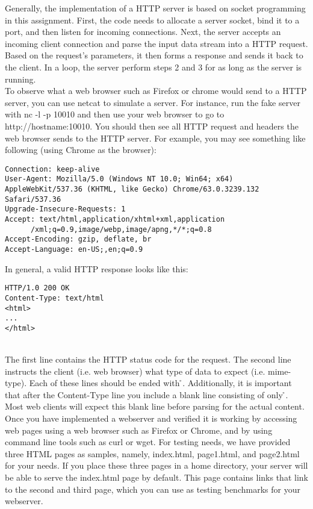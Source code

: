 \indent Generally, the implementation of a HTTP server is based on socket programming in this assignment. First, the code needs to allocate a server socket, bind it to a port, and then listen for incoming connections. Next, the server accepts an incoming client connection and parse the input data stream into a HTTP request. Based on the request's parameters, it then forms a response and sends it back to the client. In a loop, the server perform steps 2 and 3 for as long as the server is running. \\
To observe what a web browser such as Firefox or chrome would send to a HTTP server, you can use netcat to simulate a server. For instance, run the fake server with nc -l -p 10010 and then use your web browser to go to http://hostname:10010. You should then see all HTTP request and headers the web browser sends to the HTTP server. For example, you may see something like following (using Chrome as the browser): \\
\begin{verbatim}
Connection: keep-alive
User-Agent: Mozilla/5.0 (Windows NT 10.0; Win64; x64) 
AppleWebKit/537.36 (KHTML, like Gecko) Chrome/63.0.3239.132 Safari/537.36
Upgrade-Insecure-Requests: 1
Accept: text/html,application/xhtml+xml,application
      /xml;q=0.9,image/webp,image/apng,*/*;q=0.8
Accept-Encoding: gzip, deflate, br
Accept-Language: en-US;,en;q=0.9
\end{verbatim}
In general, a valid HTTP response looks like this:
\begin{verbatim}
HTTP/1.0 200 OK
Content-Type: text/html
<html>
...
</html> 
\end{verbatim}\\
The first line contains the HTTP status code for the request. The second line instructs the client (i.e. web browser) what type of data to expect (i.e. mime-type). Each of these lines should be ended with \r\n. Additionally, it is important that after the Content-Type line you include a blank line consisting of only \r\n. Most web clients will expect this blank line before parsing for the actual content. \\
Once you have implemented a webserver and verified it is working by accessing web pages using a web browser such as Firefox or Chrome, and by using command line tools such as curl or wget. For testing needs, we have provided three HTML pages as samples, namely, index.html, page1.html, and page2.html for your needs. If you place these three pages in a home directory, your server will be able to serve the index.html page by default. This page contains links that link to the second and third page, which you can use as testing benchmarks for your webserver. \\
